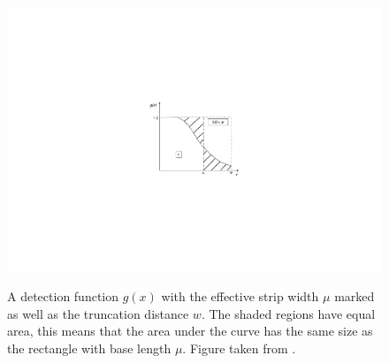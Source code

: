 \begin{figure}
\centering
\includegraphics{intro/figs/muexplanation.pdf}\\
\caption{A detection function $g(x)$ with the effective strip width $\mu$ marked as well as the truncation distance $w$. The shaded regions have equal area, this means that the area under the curve has the same size as the rectangle with base length $\mu$. Figure taken from .}
\label{ds-mu-explanation}
\end{figure}


